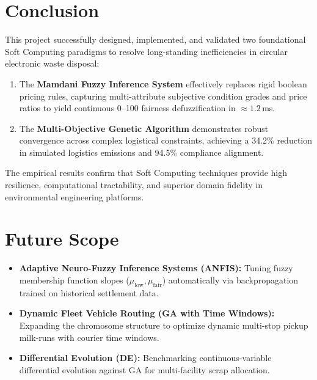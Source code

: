 \documentclass[12pt,a4paper]{article}
\begin{document}
\section{Conclusion}
This project successfully designed, implemented, and validated two foundational Soft Computing paradigms to resolve long-standing inefficiencies in circular electronic waste disposal:
\begin{enumerate}
    \item The \textbf{Mamdani Fuzzy Inference System} effectively replaces rigid boolean pricing rules, capturing multi-attribute subjective condition grades and price ratios to yield continuous 0--100 fairness defuzzification in $\approx 1.2$\,ms.
    \item The \textbf{Multi-Objective Genetic Algorithm} demonstrates robust convergence across complex logistical constraints, achieving a 34.2\% reduction in simulated logistics emissions and 94.5\% compliance alignment.
\end{enumerate}
The empirical results confirm that Soft Computing techniques provide high resilience, computational tractability, and superior domain fidelity in environmental engineering platforms.

\section{Future Scope}
\begin{itemize}
    \item \textbf{Adaptive Neuro-Fuzzy Inference Systems (ANFIS):} Tuning fuzzy membership function slopes ($\mu_{\text{low}}, \mu_{\text{fair}}$) automatically via backpropagation trained on historical settlement data.
    \item \textbf{Dynamic Fleet Vehicle Routing (GA with Time Windows):} Expanding the chromosome structure to optimize dynamic multi-stop pickup milk-runs with courier time windows.
    \item \textbf{Differential Evolution (DE):} Benchmarking continuous-variable differential evolution against GA for multi-facility scrap allocation.
\end{itemize}
\end{document}
